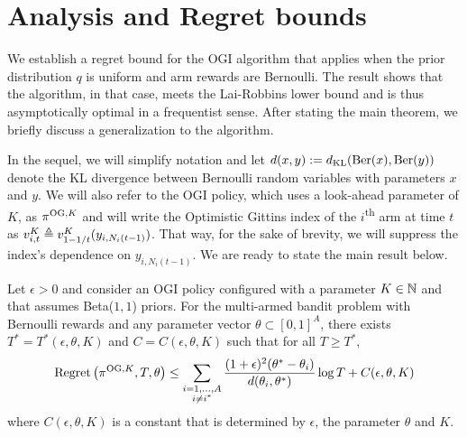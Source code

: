 \section{Analysis and Regret bounds} \label{sec:analysis_of_regret}
We establish a regret bound for the OGI algorithm that applies when the prior distribution $q$ is uniform and arm rewards are Bernoulli. The result shows that the algorithm, in that case, meets the Lai-Robbins lower bound and is thus asymptotically optimal in a frequentist sense. After stating the main theorem, we briefly discuss a generalization to the algorithm.

In the sequel, we will simplify notation  and let $d(x,y) := d_{\rm KL}(\text{Ber}(x),\text{Ber}(y))$ denote the KL divergence between Bernoulli random variables with parameters $x$ and $y$. We will also refer to the OGI policy, which uses a look-ahead parameter of $K$, as $\pi^{{\rm OG},K}$ and will write the Optimistic Gittins index of the $i$\textsuperscript{th} arm at time $t$ as $v^K_{i,t} \triangleq v^K_{1-1/t}(y_{i,N_i(t-1)})$. That way, for the sake of brevity, we will suppress the index's dependence on $y_{i,N_i(t-1)}$. We are ready to state the main result below.
\begin{theorem} \label{thm:frequentist_optimal_bound}
	Let $\epsilon > 0$ and consider an OGI policy configured with a parameter $K \in \mathbb{N}$ and that assumes Beta($1,1$) priors. For the multi-armed bandit problem with Bernoulli rewards and any parameter vector $\theta \subset [0,1]^A$, there exists $T^* = T^*(\epsilon, \theta, K)$ and $C = C(\epsilon,\theta, K)$ such that for all $T \ge T^*$,
	\begin{equation}
	\textnormal{Regret} \left( \pi^{{\rm OG},K}, T, \theta \right) \le \sum_{\substack{i=1,\ldots,A \\ i \ne i^*}} \frac{(1+\epsilon)^2(\theta^* - \theta_i)}{d(\theta_i, \theta^*)} \log T  + C(\epsilon,\theta, K)
	\end{equation}
	where $C(\epsilon,\theta, K)$ is a constant that is determined by $\epsilon$, the parameter $\theta$ and $K$.
\end{theorem}
